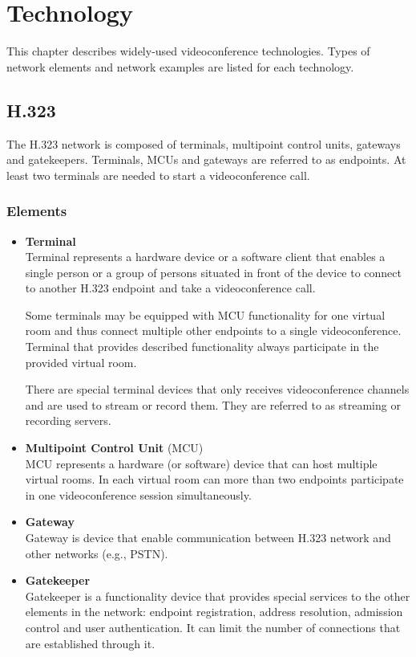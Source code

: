 \chapter{Technology}

This chapter describes widely-used videoconference technologies. Types of 
network elements and network examples are listed for each technology.

\section{H.323}

The H.323 network is composed of terminals, multipoint control units, gateways 
and gatekeepers. Terminals, MCUs and gateways are referred to as endpoints. At 
least two terminals are needed to start a videoconference call.

\subsection{Elements}

\begin{itemize}

\item \textbf{Terminal} \\
Terminal represents a hardware device or a software client that enables a 
single person or a group of persons situated in front of the device to connect 
to another H.323 endpoint and take a videoconference call.

Some terminals may be equipped with MCU functionality for one virtual room and thus connect multiple other endpoints to a single videoconference. Terminal that provides described functionality always participate in the provided virtual room.

There are special terminal devices that only receives videoconference 
channels and are used to stream or record them. They are referred to as 
streaming or recording servers.

\item \textbf{Multipoint Control Unit} (MCU) \\
MCU represents a hardware (or software) device that can host multiple virtual rooms.  In each virtual room can more than two endpoints participate in one videoconference session simultaneously.

\item \textbf{Gateway} \\
Gateway is device that enable communication between H.323 network and other 
networks (e.g., PSTN).

\item \textbf{Gatekeeper} \\
Gatekeeper is a functionality device that provides special services to the other 
elements in the network: endpoint registration, address resolution, admission 
control and user authentication. It can limit the number of connections that 
are established through it.

\end{itemize}

